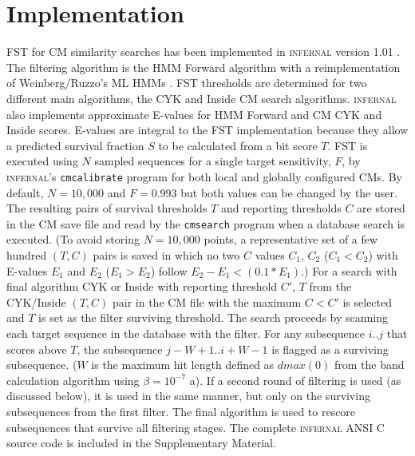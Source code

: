 \section{Implementation}

FST for CM similarity searches has been implemented in
\textsc{infernal} version 1.01 \citep{Nawrocki09}. The filtering
algorithm is the HMM Forward algorithm with a reimplementation of
Weinberg/Ruzzo's ML HMMs \citep{WeinbergRuzzo06}.  FST thresholds are
determined for two different main algorithms, the CYK and Inside CM
search algorithms. \textsc{infernal} also implements approximate
E-values for HMM Forward and CM CYK and Inside scores. E-values are
integral to the FST implementation because they allow a predicted
survival fraction $S$ to be calculated from a bit score $T$.  FST is
executed using $N$ sampled sequences for a single target sensitivity,
$F$, by \textsc{infernal}'s \texttt{cmcalibrate} program for both
local and globally configured CMs. By default, $N=10,000$ and
$F=0.993$ but both values can be changed by the user.  The resulting
pairs of survival thresholds $T$ and reporting thresholds $C$ are
stored in the CM save file and read by the \texttt{cmsearch} program
when a database search is executed.  (To avoid storing $N=10,000$
points, a representative set of a few hundred $(T,C)$ pairs is saved
in which no two $C$ values $C_1$, $C_2$ ($C_1 < C_2$) with E-values
$E_1$ and $E_2$ ($E_1 > E_2$) follow $E_2 - E_1 < (0.1 * E_1)$.)  For
a search with final algorithm CYK or Inside with reporting threshold
$C'$, $T$ from the CYK/Inside $(T,C)$ pair in the CM file with the
maximum $C < C'$ is selected and $T$ is set as the filter surviving
threshold. The search proceeds by scanning each target sequence in the
database with the filter. For any subsequence $i..j$ that scores above
$T$, the subsequence $j-W+1..i+W-1$ is flagged as a surviving
subsequence. ($W$ is the maximum hit length defined as $dmax(0)$ from
the band calculation algorithm using $\beta=10^{-7}$
\citep{NawrockiEddy07}a). If a second round of filtering is used (as
discussed below), it is used in the same manner, but only on the
surviving subsequences from the first filter.  The final algorithm is
used to rescore subsequences that survive all filtering stages. The
complete \textsc{infernal} ANSI C source code is included in the
Supplementary Material.

